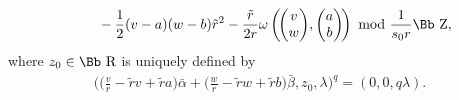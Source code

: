 \documentclass[10pt,a4paper]{amsart}
\newcommand\RR{{\mbox{\Bb R}}}
\newcommand\ZZ{{\mbox{\Bb Z}}}
\newcommand\bs{\textbf{{\rm \textbf{s}}}}
\numberwithin{equation}{section}
\begin{document}
\begin{Definition}
\begin{enumerate}
\begin{enumerate}
\begin{gather*}
\\[0.5ex] \hphantom{\bs_L=}
{}-\frac{1}{2}(v-a)(w-b)\tilde r^2
-\frac{\tilde r}{2r}\omega\left(\!\begin{pmatrix}v\\w\end{pmatrix}\!, \begin{pmatrix}a\\b\end{pmatrix}\!\right)\ {\rm mod}\ \frac{1}{s_0r}\ZZ,
\end{gather*}
where $z_0\in\RR$ is uniquely defined by
\begin{gather*}
\bigg(\bigg(\frac vr-\tilde rv+\tilde ra\bigg)\bar\alpha+\bigg(\frac{w}{r}-\tilde rw+\tilde rb\bigg)\bar\beta,z_0,\lambda\bigg)^q=(0,0,q\lambda).
\end{gather*}
\end{enumerate}
\end{enumerate}
\end{Definition}
\end{document}
